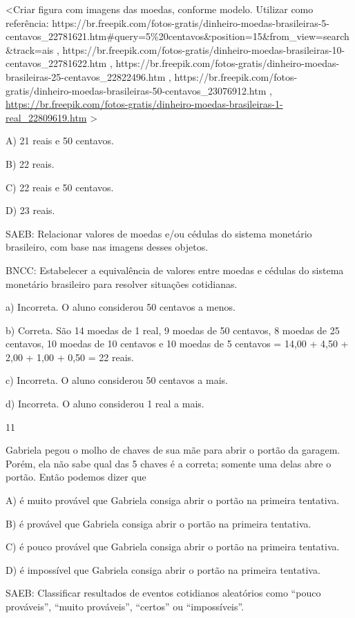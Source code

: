 \begin{escolha}
\begin{escolha}
{{{{\textless{}Criar figura com imagens das moedas, conforme modelo.
Utilizar como referência:
https://br.freepik.com/fotos-gratis/dinheiro-moedas-brasileiras-5-centavos\_22781621.htm\#query=5\%20centavos\&position=15\&from\_view=search\&track=ais
,
https://br.freepik.com/fotos-gratis/dinheiro-moedas-brasileiras-10-centavos\_22781622.htm
,
https://br.freepik.com/fotos-gratis/dinheiro-moedas-brasileiras-25-centavos\_22822496.htm
,
https://br.freepik.com/fotos-gratis/dinheiro-moedas-brasileiras-50-centavos\_23076912.htm
,
\url{https://br.freepik.com/fotos-gratis/dinheiro-moedas-brasileiras-1-real_22809619.htm}
\textgreater{}

A) 21 reais e 50 centavos.

B) 22 reais.

C) 22 reais e 50 centavos.

D) 23 reais.

SAEB: Relacionar valores de moedas e/ou cédulas do sistema
monetário brasileiro, com base nas imagens desses objetos.

BNCC: Estabelecer a equivalência de valores entre moedas e
cédulas do sistema monetário brasileiro para resolver situações
cotidianas.

a) Incorreta. O aluno considerou 50 centavos a menos.

b) Correta. São 14 moedas de 1 real, 9 moedas de 50 centavos, 8 moedas
de 25 centavos, 10 moedas de 10 centavos e 10 moedas de 5 centavos =
14,00 + 4,50 + 2,00 + 1,00 + 0,50 = 22 reais.

c) Incorreta. O aluno considerou 50 centavos a mais.

d) Incorreta. O aluno considerou 1 real a mais.

\num{11}

Gabriela pegou o molho de chaves de sua mãe para abrir o portão da
garagem. Porém, ela não sabe qual das 5 chaves é a correta; somente uma
delas abre o portão. Então podemos dizer que

A) é muito provável que Gabriela consiga abrir o portão na primeira tentativa.

B) é provável que Gabriela consiga abrir o portão na primeira tentativa.

C) é pouco provável que Gabriela consiga abrir o portão na primeira tentativa.

D) é impossível que Gabriela consiga abrir o portão na primeira tentativa.

SAEB: Classificar resultados de eventos cotidianos aleatórios
como ``pouco prováveis'', ``muito prováveis'', ``certos'' ou
``impossíveis''.

}}}}
\end{escolha}
\end{escolha}
